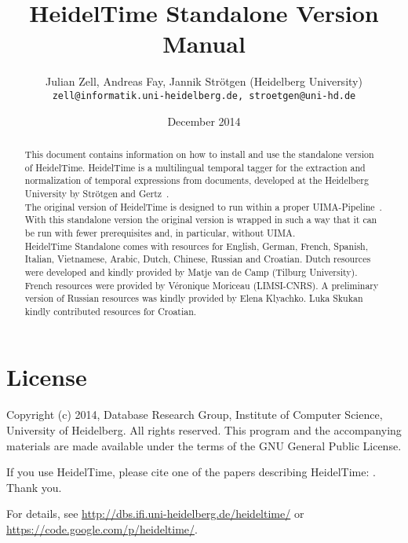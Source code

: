 \documentclass[
     11pt,         %
     a4paper,      %
     oneside,
     ]{article}
\newcommand{\languages}{English, German, French, Spanish, Italian, Vietnamese, Arabic, Dutch, Chinese, Russian and Croatian}
\begin{document}
\title{%
HeidelTime Standalone Version\\
Manual
}
\author{Julian Zell, Andreas Fay, Jannik Str\"otgen (Heidelberg University)\\[0.2em]
\small \texttt{zell@informatik.uni-heidelberg.de, stroetgen@uni-hd.de}
}
\date{December 2014}
\maketitle

\begin{abstract}
This document contains information on how to install and use the standalone version of HeidelTime. HeidelTime is a multilingual temporal tagger for the extraction and normalization of temporal expressions from documents, developed at the Heidelberg University by Str\"otgen and Gertz~\cite{Strotgen2010, HeidelTime, StroetgenGertz2013}.\\
The original version of HeidelTime is designed to run within a proper UIMA-Pipeline~\cite{UIMA}. With this standalone version the original version is wrapped in such a way that it can be run with fewer prerequisites and, in particular, without UIMA.\\
HeidelTime Standalone comes with resources for \languages. Dutch resources were developed and kindly provided by Matje van de Camp (Tilburg University)\cite{Matje}. French resources were provided by Véronique Moriceau (LIMSI-CNRS)\cite{Veronique}. A preliminary version of Russian resources was kindly provided by Elena Klyachko\cite{Elena}. Luka Skukan\cite{Luka} kindly contributed resources for Croatian.
\end{abstract}

\newpage
\tableofcontents
\newpage






\newpage
\section{License}
Copyright (c) 2014, Database Research Group, Institute of Computer Science, University of Heidelberg. 
All rights reserved. This program and the accompanying materials 
are made available under the terms of the GNU General Public License.

If you use HeidelTime, please cite one of the papers describing HeidelTime: \cite{Strotgen2010, StroetgenGertz2013}. Thank you.

For details, see \url{http://dbs.ifi.uni-heidelberg.de/heideltime/} or \\
\url{https://code.google.com/p/heideltime/}.



\newpage



\newpage

\end{document}
